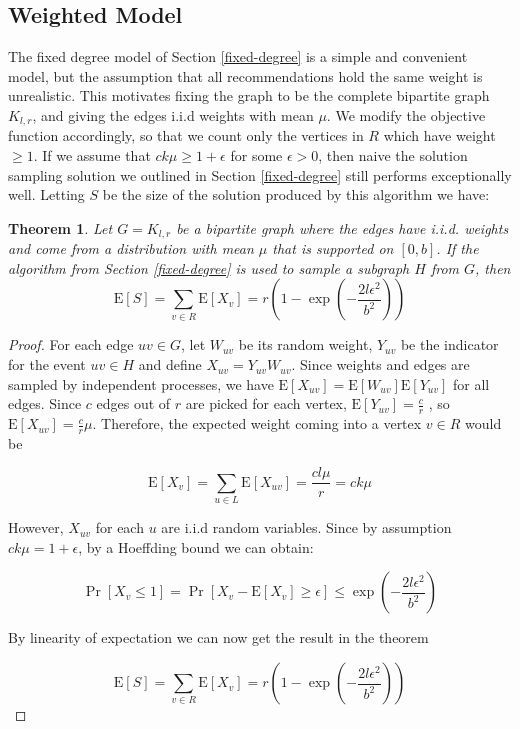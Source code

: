 \documentclass[]{article}
\newcommand{\E}{\text{E}}
\newtheorem{thm}{Theorem}
\begin{document}
\subsection{Weighted Model}
\label{weighted}
The fixed degree model of Section \ref{fixed-degree} is a simple and
convenient model, but the assumption that all recommendations hold the
same weight is unrealistic. This motivates fixing the graph to be the
complete bipartite graph $K_{l,r}$, and giving the edges i.i.d weights
with mean $\mu$. We modify the objective function accordingly, so that
we count only the vertices in $R$ which have weight $\geq 1$. If we
assume that $ck\mu \geq 1+\epsilon$ for some $\epsilon > 0$, then 
naive the solution sampling solution we outlined in Section \ref{fixed-degree}
still performs exceptionally well. Letting $S$ be the size of the 
solution produced by this algorithm we have:

\begin{thm}
Let $G=K_{l,r}$ be a bipartite graph where the edges have i.i.d. weights and come from a distribution with mean $\mu$ that is supported on $[0,b]$. If the algorithm from Section \ref{fixed-degree} is used to sample a subgraph $H$ from $G$, then
\[ \E[S] = \sum_{v\in R} \E[X_v] = r\left(1-\exp\left(-\frac{2l\epsilon^2}{b^2}\right)\right) \]
\end{thm}

\begin{proof}
For each edge $uv\in G$, let $W_{uv}$ be its random weight, $Y_{uv}$ be
the indicator for the event $uv\in H$ and define $X_{uv} = Y_{uv}
W_{uv}$. Since weights and edges are sampled by independent processes,
we have $\E[X_{uv}] = \E[W_{uv}]\E[Y_{uv}]$ for all edges. Since $c$
edges out of $r$ are picked for each vertex, $\E[Y_{uv}] = \frac{c}{r}$
, so $\E[X_{uv}] = \frac{c}{r}\mu$. Therefore, the expected weight
coming into a vertex $v\in R$ would be 

\[ \E[X_v] = \sum_{u\in L} \E[X_{uv}] = \frac{cl\mu}{r} = ck\mu\]

However, $X_{uv}$ for each $u$ are i.i.d random variables. Since by
assumption $ck\mu = 1+\epsilon$, by a Hoeffding bound we can obtain:

\[ \Pr[X_v \leq 1] = \Pr[X_v - \E[X_v] \geq \epsilon] \leq \exp\left(-\frac{2l\epsilon^2}{b^2}\right) \]

By linearity of expectation we can now get the result in the theorem

\[ \E[S] = \sum_{v\in R} \E[X_v] = r\left(1-\exp\left(-\frac{2l\epsilon^2}{b^2}\right)\right) \]
\end{proof}
\end{document}
